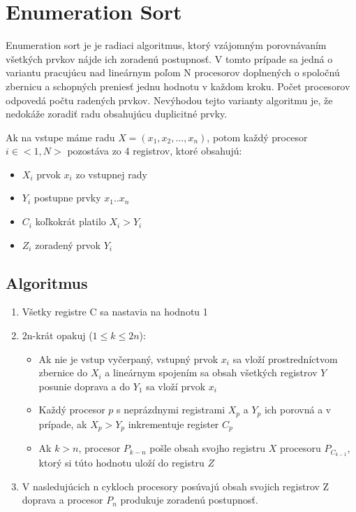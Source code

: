 \documentclass[a4paper,11pt]{article}
\begin{document}
\section{Enumeration Sort}
Enumeration sort je je radiaci algoritmus, ktorý vzájomným porovnávaním všetkých prvkov nájde ich zoradenú postupnosť. V tomto prípade sa jedná o variantu pracujúcu nad lineárnym poľom N procesorov doplnených o spoločnú zbernicu a schopných preniesť jednu hodnotu v každom kroku. Počet procesorov odpovedá počtu radených prvkov. Nevýhodou tejto varianty algoritmu je, že nedokáže zoradiť radu obsahujúcu duplicitné prvky.

Ak na vstupe máme radu $X=(x_1, x_2, ..., x_n)$, potom každý procesor $i \in <1,N>$ pozostáva zo 4 registrov, ktoré obsahujú:
\begin{itemize}
\item $X_i$ prvok $x_i$ zo vstupnej rady
\item $Y_i$ postupne prvky $x_1$..$x_n$
\item $C_i$ koľkokrát platilo $X_i > Y_i$
\item $Z_i$ zoradený prvok $Y_i$
\end{itemize}

\subsection{Algoritmus}
\begin{enumerate}
\item Všetky registre C sa nastavia na hodnotu 1
\item 2n-krát opakuj ($ 1 \leq k \leq 2n$):
\begin{itemize}
\item Ak nie je vstup vyčerpaný, vstupný prvok $x_i$ sa vloží prostredníctvom zbernice do $X_i$ a lineárnym spojením sa obsah všetkých registrov $Y$ posunie doprava a do $Y_1$ sa vloží prvok $x_i$
\item Každý procesor $p$ s neprázdnymi registrami $X_p$ a $Y_p$ ich porovná a v prípade, ak $X_p > Y_p$ inkrementuje register $C_p$
\item Ak $k > n$, procesor $P_{k-n}$ pošle obsah svojho registru $X$ procesoru $P_{C_{k-1}}$, ktorý si túto hodnotu uloží do registru $Z$
\end{itemize}
\item V nasledujúcich n cykloch procesory posúvajú obsah svojich registrov Z doprava a procesor $P_n$ produkuje zoradenú postupnosť.
\end{enumerate}
\end{document}
